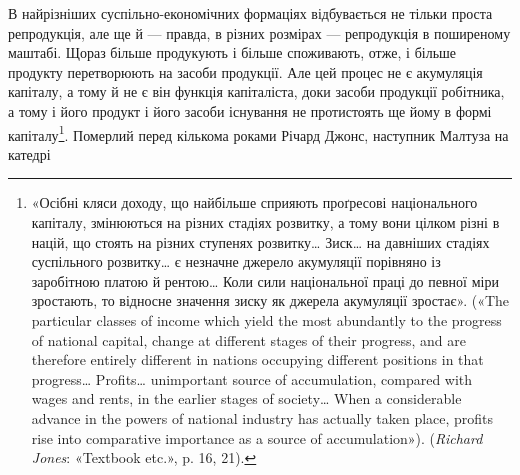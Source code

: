В найрізніших суспільно-економічних формаціях відбувається
не тільки проста репродукція, але ще й — правда, в різних
розмірах — репродукція в поширеному маштабі. Щораз більше
продукують і більше споживають, отже, і більше продукту перетворюють
на засоби продукції. Але цей процес не є акумуляція
капіталу, а тому й не є він функція капіталіста, доки засоби продукції
робітника, а тому і його продукт і його засоби існування
не протистоять ще йому в формі
капіталу\footnote{\label{footnote-47}«Осібні кляси доходу, що найбільше сприяють проґресові національного
капіталу, змінюються на різних стадіях розвитку, а тому вони
цілком різні в націй, що стоять на різних ступенях розвитку\dots{} Зиск\dots{}
на давніших стадіях суспільного розвитку\dots{} є незначне джерело акумуляції
порівняно із заробітною платою й рентою\dots{} Коли сили національної
праці до певної міри зростають, то відносне значення зиску як
джерела акумуляції зростає». («The particular classes of income which
yield the most abundantly to the progress of national capital, change at
different stages of their progress, and are therefore entirely different in
nations occupying different positions in that progress\dots{} Profits\dots{} unimportant
source of accumulation, compared with wages and rents, in the
earlier stages of society\dots{} When a considerable advance in the powers of
national industry has actually taken place, profits rise into comparative
importance as a source of accumulation»). (\emph{Richard Jones}: «Textbook
etc.», p. 16, 21).
}. Померлий перед
кількома роками Річард Джонс, наступник Малтуза на катедрі
\parbreak{}  %
